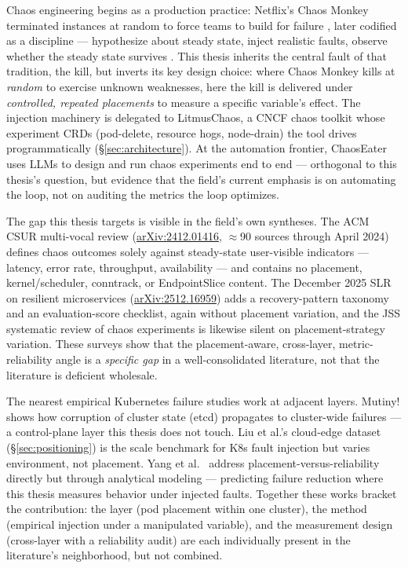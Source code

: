 Chaos engineering begins as a production practice: Netflix's Chaos Monkey
terminated instances at random to force teams to build for failure
\citep{netflix2011simian}, later codified as a discipline --- hypothesize about
steady state, inject realistic faults, observe whether the steady state
survives \citep{basiri2016chaos}. This thesis inherits the central fault of that
tradition, the kill, but inverts its key design choice: where Chaos Monkey kills
at \emph{random} to exercise unknown weaknesses, here the kill is delivered
under \emph{controlled, repeated placements} to measure a specific variable's
effect. The injection machinery is delegated to LitmusChaos, a CNCF chaos
toolkit whose experiment CRDs (pod-delete, resource hogs, node-drain) the tool
drives programmatically (\S\ref{sec:architecture}). At the automation frontier,
ChaosEater \citep{kikuta2025chaoseater} uses LLMs to design and run chaos
experiments end to end --- orthogonal to this thesis's question, but evidence
that the field's current emphasis is on automating the loop, not on auditing the
metrics the loop optimizes.

The gap this thesis targets is visible in the field's own syntheses. The ACM
CSUR multi-vocal review (\href{https://arxiv.org/abs/2412.01416}{arXiv:2412.01416},
$\approx$90 sources through April 2024) defines chaos outcomes solely against
steady-state user-visible indicators --- latency, error rate, throughput,
availability --- and contains no placement, kernel/scheduler, conntrack, or
EndpointSlice content. The December 2025 SLR on resilient microservices
(\href{https://arxiv.org/abs/2512.16959}{arXiv:2512.16959}) adds a
recovery-pattern taxonomy and an evaluation-score checklist, again without
placement variation, and the JSS systematic review of chaos experiments
\citep{awad2025chaosslr} is likewise silent on placement-strategy variation.
These surveys show that the placement-aware, cross-layer, metric-reliability
angle is a \emph{specific gap} in a well-consolidated literature, not that the
literature is deficient wholesale.

The nearest empirical Kubernetes failure studies work at adjacent layers.
Mutiny! \citep{barletta2024mutiny} shows how corruption of cluster state (etcd)
propagates to cluster-wide failures --- a control-plane layer this thesis does
not touch. Liu et al.'s cloud-edge dataset (\S\ref{sec:positioning}) is the
scale benchmark for K8s fault injection but varies environment, not placement.
Yang et al.\ \citep{yang2024networkaware} address placement-versus-reliability
directly but through analytical modeling --- predicting failure reduction where
this thesis measures behavior under injected faults. Together these works
bracket the contribution: the layer (pod placement within one cluster), the
method (empirical injection under a manipulated variable), and the measurement
design (cross-layer with a reliability audit) are each individually present in
the literature's neighborhood, but not combined.

